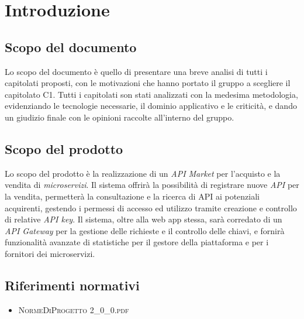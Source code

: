 \newpage
\section{Introduzione}

\subsection{Scopo del documento}
Lo scopo del documento è quello di presentare una breve analisi di tutti i capitolati proposti, con le motivazioni che hanno portato il gruppo a scegliere il capitolato C1. Tutti i capitolati son stati analizzati con la medesima metodologia,  evidenziando le tecnologie necessarie, il dominio applicativo e le criticità, e dando un giudizio finale con le opinioni raccolte all'interno del gruppo.

\subsection{Scopo del prodotto}
Lo scopo del prodotto è la realizzazione di un \textit{API Market} per l'acquisto e la vendita di \textit{microservizi}. Il sistema offrirà la possibilità di registrare nuove \textit{API} per la vendita, permetterà la consultazione e la ricerca di API ai potenziali acquirenti, gestendo i permessi di accesso ed utilizzo tramite creazione e controllo di relative \textit{API key}. Il sistema, oltre alla web app stessa, sarà corredato di un \textit{API Gateway} per la gestione delle richieste e il controllo delle chiavi, e fornirà funzionalità avanzate di statistiche per il gestore della piattaforma e per i fornitori dei microservizi.

\subsection{Riferimenti normativi}
\begin{itemize}
	\item \textsc{NormeDiProgetto 2\_0\_0.pdf}
\end{itemize}

